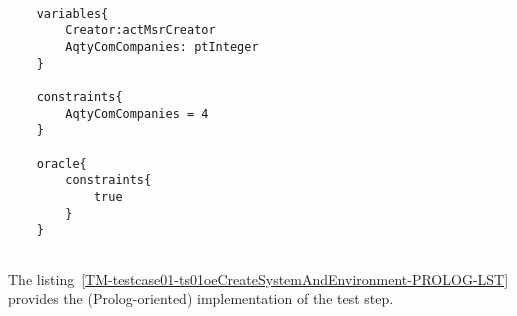 	\scriptsize
	\vspace{0.5cm}
	\begin{lstlisting}[style=MessirStyle,firstnumber=auto,captionpos=b,caption={\msrmessir (MCL-oriented) specification of the test step \emph{testcase01-ts01oeCreateSystemAndEnvironment}.},label=TM-testcase01-ts01oeCreateSystemAndEnvironment-MCL-LST]

	variables{
		Creator:actMsrCreator
		AqtyComCompanies: ptInteger
	}
	
	constraints{
		AqtyComCompanies = 4
	}
	
	oracle{
		constraints{
			true
		}
	}
	
	\end{lstlisting}
	\normalsize 
	
	
	\vspace{1cm}
	The listing~\ref{TM-testcase01-ts01oeCreateSystemAndEnvironment-PROLOG-LST} provides the \msrmessir (Prolog-oriented) implementation of the test step.
	
	\scriptsize
	\vspace{0.5cm}
	
	
	\normalsize
	
